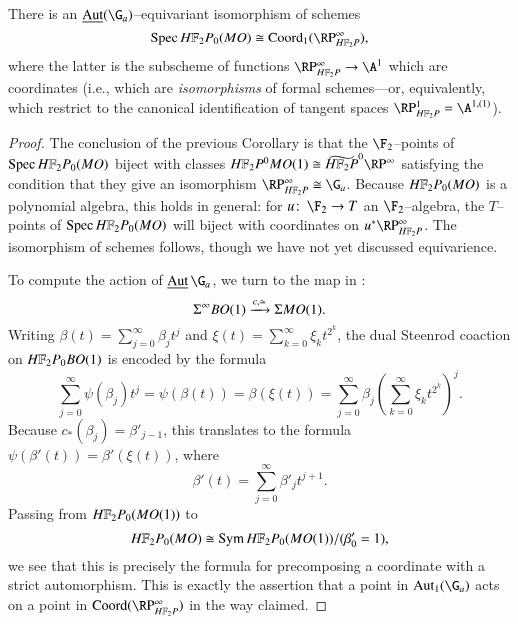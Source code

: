 \begin{corollary}
There is an $\InternalAut(\G_a)$--equivariant isomorphism of schemes \[\Spec \HFtwo P_0(MO) \cong \Coord_1(\RP^\infty_{\HFtwo P}),\] where the latter is the subscheme of functions $\RP^\infty_{\HFtwo P} \to \A^1$ which are coordinates (i.e., which are \emph{isomorphisms} of formal schemes---or, equivalently, which restrict to the canonical identification of tangent spaces $\RP^1_{\HFtwo P} = \A^{1,(1)}$).
\end{corollary}
\begin{proof}
The conclusion of the previous Corollary is that the $\F_2$--points of $\Spec \HFtwo P_0(MO)$ biject with classes $\HFtwo P^0 MO(1) \cong \widetilde{\HFtwo P}^0 \RP^\infty$ satisfying the condition that they give an isomorphism $\RP^\infty_{\HFtwo P} \cong \G_a$.  Because $\HFtwo P_0(MO)$ is a polynomial algebra, this holds in general: for $u\co \F_2 \to T$ an $\F_2$--algebra, the $T$--points of $\Spec \HFtwo P_0(MO)$ will biject with coordinates on $u^* \RP^\infty_{\HFtwo P}$.  The isomorphism of schemes follows, though we have not yet discussed equivarience.

To compute the action of $\InternalAut \G_a$, we turn to the map in : \[\Sigma^\infty BO(1) \xrightarrow{c, \simeq} \Sigma MO(1).\]  Writing $\beta(t) = \sum_{j=0}^\infty \beta_j t^j$ and $\xi(t) = \sum_{k=0}^\infty \xi_k t^{2^k}$, the dual Steenrod coaction on $\HFtwo P_0 BO(1)$ is encoded by the formula \[\sum_{j=0}^\infty \psi(\beta_j) t^j = \psi(\beta(t)) = \beta(\xi(t)) = \sum_{j=0}^\infty \beta_j \left(\sum_{k=0}^\infty \xi_k t^{2^k} \right)^j.\]  Because $c_*(\beta_j) = \beta'_{j-1}$, this translates to the formula $\psi(\beta'(t)) = \beta'(\xi(t))$, where \[\beta'(t) = \sum_{j=0}^\infty \beta'_j t^{j+1}.\]  Passing from $\HFtwo P_0(MO(1))$ to \[\HFtwo P_0(MO) \cong \Sym \HFtwo P_0(MO(1)) / (\beta'_0 = 1),\] we see that this is precisely the formula for precomposing a coordinate with a strict automorphism.  This is exactly the assertion that a point in $\Aut_1(\G_a)$ acts on a point in $\Coord(\RP^\infty_{\HFtwo P})$ in the way claimed.
\end{proof}

